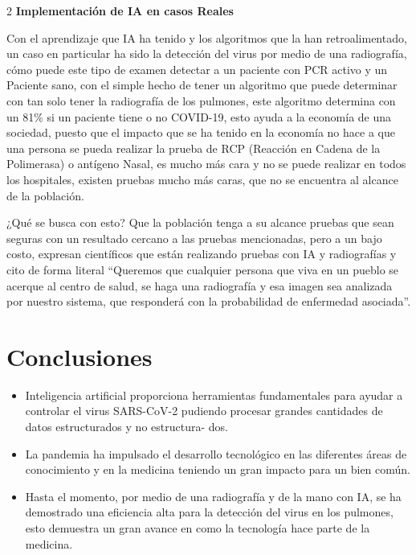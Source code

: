 \documentclass[12pt,spanish,Letterpaper,openany]{book}
\begin{document}
\begin {multicols}{2}
\textbf{Implementación de IA en casos Reales}

Con el aprendizaje que IA ha tenido y los algoritmos que la han retroalimentado, un caso en
particular ha sido la detección del virus por medio de una radiografía, cómo puede este tipo
de examen detectar a un paciente con PCR activo y un Paciente sano, con el simple hecho de
tener un algoritmo que puede determinar con tan solo tener la radiografía de los pulmones,
este algoritmo determina con un 81\% si un paciente tiene o no COVID-19, esto ayuda a la
economía de una sociedad, puesto que el impacto que se ha tenido en la economía no hace a
que una persona se pueda realizar la prueba de RCP (Reacción en Cadena de la Polimerasa)
o antígeno Nasal, es mucho más cara y no se puede realizar en todos los hospitales, existen
pruebas mucho más caras, que no se encuentra al alcance de la población.

¿Qué se busca con esto? Que la población tenga a su alcance pruebas que sean seguras con
un resultado cercano a las pruebas mencionadas, pero a un bajo costo, expresan científicos
que están realizando pruebas con IA y radiografías y cito de forma literal ``Queremos que
cualquier persona que viva en un pueblo se acerque al centro de salud, se haga una radiografía
y esa imagen sea analizada por nuestro sistema, que responderá con la probabilidad de
enfermedad asociada''.

\hypertarget{conclusiones-2}{%
\section{Conclusiones}\label{conclusiones-2}}

\begin{itemize}
\item
  Inteligencia artificial proporciona herramientas fundamentales para ayudar a
  controlar el virus SARS-CoV-2 pudiendo procesar grandes cantidades de datos
  estructurados y no estructura-
  dos.
\item
  La pandemia ha impulsado el desarrollo tecnológico en las diferentes áreas de
  conocimiento y en la medicina teniendo un gran impacto para un bien común.
\item
  Hasta el momento, por medio de una radiografía y de la mano con IA, se ha
  demostrado una eficiencia alta para la detección del virus en los pulmones, esto
  demuestra un gran avance en como la tecnología hace parte de la medicina.
\end{itemize}

\hypertarget{referencias-3}{%
}
\end{multicols}
\end{document}
